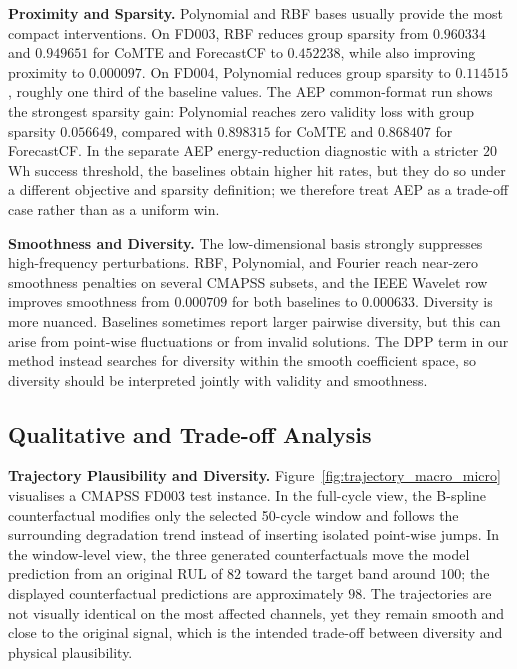\documentclass[runningheads]{llncs}
\begin{document}
	\noindent\textbf{Proximity and Sparsity.} Polynomial and RBF bases usually provide the most compact interventions. On FD003, RBF reduces group sparsity from $0.960334$ and $0.949651$ for CoMTE and ForecastCF to $0.452238$, while also improving proximity to $0.000097$. On FD004, Polynomial reduces group sparsity to $0.114515$, roughly one third of the baseline values. The AEP common-format run shows the strongest sparsity gain: Polynomial reaches zero validity loss with group sparsity $0.056649$, compared with $0.898315$ for CoMTE and $0.868407$ for ForecastCF. In the separate AEP energy-reduction diagnostic with a stricter $20$ Wh success threshold, the baselines obtain higher hit rates, but they do so under a different objective and sparsity definition; we therefore treat AEP as a trade-off case rather than as a uniform win.
	
	\noindent\textbf{Smoothness and Diversity.} The low-dimensional basis strongly suppresses high-frequency perturbations. RBF, Polynomial, and Fourier reach near-zero smoothness penalties on several CMAPSS subsets, and the IEEE Wavelet row improves smoothness from $0.000709$ for both baselines to $0.000633$. Diversity is more nuanced. Baselines sometimes report larger pairwise diversity, but this can arise from point-wise fluctuations or from invalid solutions. The DPP term in our method instead searches for diversity within the smooth coefficient space, so diversity should be interpreted jointly with validity and smoothness.
	
	
	\subsection{Qualitative and Trade-off Analysis}
	\label{subsec:qualitative}
	
	\textbf{Trajectory Plausibility and Diversity.} Figure~\ref{fig:trajectory_macro_micro} visualises a CMAPSS FD003 test instance. In the full-cycle view, the B-spline counterfactual modifies only the selected 50-cycle window and follows the surrounding degradation trend instead of inserting isolated point-wise jumps. In the window-level view, the three generated counterfactuals move the model prediction from an original RUL of $82$ toward the target band around $100$; the displayed counterfactual predictions are approximately $98$. The trajectories are not visually identical on the most affected channels, yet they remain smooth and close to the original signal, which is the intended trade-off between diversity and physical plausibility.
	
\end{document}
